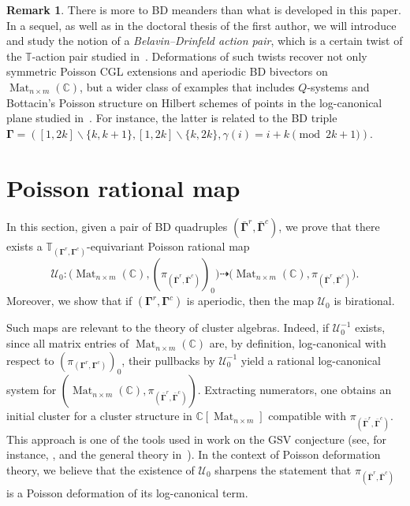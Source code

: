 \documentclass[11pt]{article}
\newcommand{\bbg}{\bar{\mathbf{\Gamma}}}
\newcommand{\bg}{\mathbf{\Gamma}}
\DeclareMathOperator{\Mat}{Mat}
\theoremstyle{definition}\newtheorem{definition}[theorem]{Definition}
\theoremstyle{definition}\newtheorem{remark}[theorem]{Remark}
\theoremstyle{remark}
\numberwithin{equation}{section}
\begin{document}
\begin{remark}
   There is more to BD meanders than what is developed in this paper.
    In a sequel, as well as in the doctoral thesis of the first author, we will introduce and study the notion of a \emph{Belavin--Drinfeld action pair}, which is a certain twist of the $\mathbb{T}$-action pair studied in~\cite{lm-deform}. Deformations of such twists recover not only symmetric Poisson CGL extensions and aperiodic BD bivectors on $\Mat_{n\times m}(\mathbb{C})$, but a wider class of examples that includes $Q$-systems and Bottacin's Poisson structure on Hilbert schemes of points in the log-canonical plane studied in~\cite{mps-hilbert}. For instance, the latter is related to the BD triple
    $\bg = ([1,2k] \backslash\{k,k+1\}, [1,2k] \backslash \{k,2k\}, \gamma (i) = i+k \pmod{2k+1})$.
\end{remark}

\section{\texorpdfstring{Poisson rational map}{Poisson rational map}}\label{s:birat}

In this section, given a pair of BD quadruples $(\bbg^r,\bbg^c)$, we prove that there exists a $\mathbb{T}_{(\bg^r,\bg^c)}$-equivariant Poisson rational map
\begin{equation}\label{eq:map}
    \mathcal{U}_0 : \big(\Mat_{n\times m}(\mathbb{C}),(\pi_{(\bbg^r,\bbg^c)})_0\big) \dashrightarrow \big(\Mat_{n\times m}(\mathbb{C}),\pi_{(\bbg^r,\bbg^c)}\big).
\end{equation}
Moreover, we show that if $(\bg^r,\bg^c)$ is aperiodic, then the map $\mathcal{U}_0$ is birational.

Such maps are relevant to the theory of cluster algebras. Indeed, if $\mathcal{U}_0^{-1}$ exists, since all matrix entries of $\Mat_{n\times m}(\mathbb{C})$ are, by definition, log-canonical with respect to $(\pi_{(\bg^r,\bg^c)})_0$, their pullbacks by $\mathcal{U}_0^{-1}$ yield a rational log-canonical system for $(\Mat_{n\times m}(\mathbb{C}),\pi_{(\bbg^r,\bbg^c)})$. Extracting numerators, one obtains an initial cluster for a cluster structure in $\mathbb{C}[\Mat_{n\times m}]$ compatible with $\pi_{(\bbg^r,\bbg^c)}$. This approach is one of the tools used in work on the GSV conjecture (see, for instance, \cite{gsv-unified,multdual}, and the general theory in~\cite{zametka}). In the context of Poisson deformation theory, we believe that the existence of $\mathcal{U}_0$ sharpens the statement that $\pi_{(\bbg^r,\bbg^c)}$ is a Poisson deformation of its log-canonical term.
\end{document}
